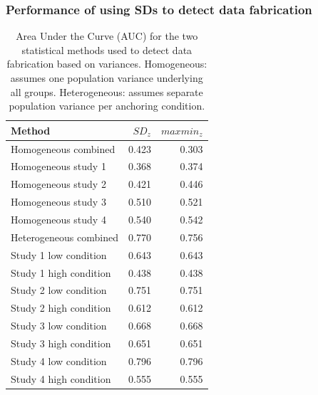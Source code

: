 \documentclass{article}
\begin{document}
\subsubsection*{Performance of using SDs to detect data fabrication}

\begin{table}[ht]
\centering
\begin{tabular}{lrr}
  \hline
Method & $SD_z$ & $maxmin_z$ \\ 
  \hline
Homogeneous combined & 0.423 & 0.303 \\ 
  Homogeneous study 1 & 0.368 & 0.374 \\ 
  Homogeneous study 2 & 0.421 & 0.446 \\ 
  Homogeneous study 3 & 0.510 & 0.521 \\ 
  Homogeneous study 4 & 0.540 & 0.542 \\ 
  Heterogeneous combined & 0.770 & 0.756 \\ 
  Study 1 low condition & 0.643 & 0.643 \\ 
  Study 1 high condition & 0.438 & 0.438 \\ 
  Study 2 low condition & 0.751 & 0.751 \\ 
  Study 2 high condition & 0.612 & 0.612 \\ 
  Study 3 low condition & 0.668 & 0.668 \\ 
  Study 3 high condition & 0.651 & 0.651 \\ 
  Study 4 low condition & 0.796 & 0.796 \\ 
  Study 4 high condition & 0.555 & 0.555 \\ 
   \hline
\end{tabular}
\caption{Area Under the Curve (AUC) for the two statistical methods used to detect data fabrication based on variances. Homogeneous: assumes one population variance underlying all groups. Heterogeneous: assumes separate population variance per anchoring condition.} 
\label{auc_variances}
\end{table}
\end{document}
